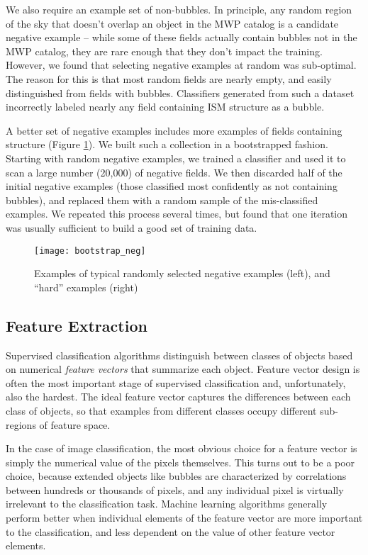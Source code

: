 \documentclass[preprint]{aastex}
\begin{document}
We also require an example set of non-bubbles. In principle, any random region of the sky that doesn't overlap an object in the MWP catalog is a candidate negative example -- while some of these fields actually contain bubbles not in the MWP catalog, they are rare enough that they don't  impact the training. However, we found that selecting negative examples at random was sub-optimal. The reason for this is that most random fields are nearly empty, and easily distinguished from fields with bubbles. Classifiers generated from such a dataset incorrectly labeled nearly any field containing ISM structure as a bubble.

A better set of negative examples includes more examples of fields containing structure (Figure \ref{fig:bootstrap_neg}). We built such a collection in a bootstrapped fashion. Starting with random negative examples, we trained a classifier and used it to scan a large number (20,000) of negative fields. We then discarded half of the initial negative examples (those classified most confidently as not containing bubbles), and replaced them with a random sample of the mis-classified examples. We repeated this process several times, but found that one iteration was usually sufficient to build a good set of training data.

\begin{figure}[h!]
\texttt{[image: bootstrap\_neg]}
\caption{Examples of typical randomly selected negative examples (left), and ``hard'' examples (right)}
\label{fig:bootstrap_neg}
\end{figure}

\subsection{Feature Extraction}
\label{sec:method_feature_extraction}
Supervised classification algorithms distinguish between classes of objects based on numerical \textit{feature vectors} that summarize each object. Feature vector design is often the most important stage of supervised classification and, unfortunately, also the hardest. The ideal feature vector captures the differences between each class of objects, so that examples from different classes occupy different sub-regions of feature space. 

In the case of image classification, the most obvious choice for a feature vector is simply the numerical value of the pixels themselves. This turns out to be a poor choice, because extended objects like bubbles are characterized by correlations between hundreds or thousands of pixels, and any individual pixel is virtually irrelevant to the classification task. Machine learning algorithms generally perform better when individual elements of the feature vector are more important to the classification, and less dependent on the value of other feature vector elements.
\end{document}
